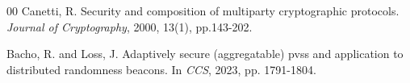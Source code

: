 \documentclass[runningheads]{llncs}
\begin{document}
\begin{thebibliography}{00}
Canetti, R. Security and composition of multiparty cryptographic protocols. \textit{Journal of Cryptography}, 2000, 13(1), pp.143-202.



Bacho, R. and Loss, J. Adaptively secure (aggregatable) pvss and application to distributed randomness beacons. In \textit{CCS}, 2023, pp. 1791-1804.












\end{thebibliography}
\end{document}

